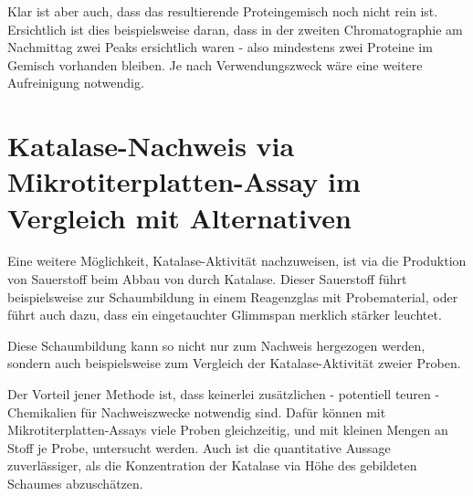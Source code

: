 \documentclass[a4paper,german]{scrreprt}
\begin{document}
Klar ist aber auch, dass das resultierende Proteingemisch noch nicht rein ist.
Ersichtlich ist dies beispielsweise daran, dass in der zweiten Chromatographie
am Nachmittag zwei Peaks ersichtlich waren - also mindestens zwei Proteine im
Gemisch vorhanden bleiben. Je nach Verwendungszweck wäre eine weitere
Aufreinigung notwendig.

\section{Katalase-Nachweis via Mikrotiterplatten-Assay im Vergleich mit Alternativen}

Eine weitere Möglichkeit, Katalase-Aktivität nachzuweisen, ist via die
Produktion von Sauerstoff beim Abbau von  durch Katalase. Dieser
Sauerstoff führt beispielsweise zur Schaumbildung in einem Reagenzglas mit
Probematerial, oder führt auch dazu, dass ein eingetauchter Glimmspan merklich
stärker leuchtet.

Diese Schaumbildung kann so nicht nur zum Nachweis hergezogen werden, sondern
auch beispielsweise zum Vergleich der Katalase-Aktivität zweier Proben.

Der Vorteil jener Methode ist, dass keinerlei zusätzlichen - potentiell teuren
- Chemikalien für Nachweiszwecke notwendig sind. Dafür können mit
Mikrotiterplatten-Assays viele Proben gleichzeitig, und mit kleinen Mengen an
Stoff je Probe, untersucht werden. Auch ist die quantitative Aussage
zuverlässiger, als die Konzentration der Katalase via Höhe des gebildeten
Schaumes abzuschätzen.



\end{document}
